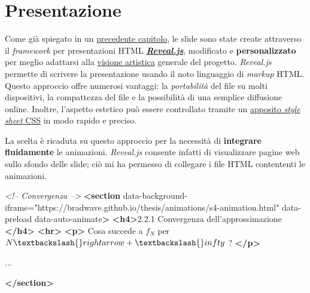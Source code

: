 \documentclass[
]{book}
\newenvironment{Shaded}{\begin{snugshade}}{\end{snugshade}}
\newcommand{\CommentTok}[1]{\textcolor[rgb]{0.56,0.35,0.01}{\textit{#1}}}
\newcommand{\KeywordTok}[1]{\textcolor[rgb]{0.13,0.29,0.53}{\textbf{#1}}}
\newcommand{\NormalTok}[1]{#1}
\newcommand{\OtherTok}[1]{\textcolor[rgb]{0.56,0.35,0.01}{#1}}
\newcommand{\StringTok}[1]{\textcolor[rgb]{0.31,0.60,0.02}{#1}}
\begin{document}
\begin{Shaded}
\begin{Highlighting}[]
    
\end{Highlighting}
\end{Shaded}

\hypertarget{pressoft}{%
\section{Presentazione}\label{pressoft}}

Come già spiegato in un \protect\hyperlink{presentazione}{precedente capitolo}, le slide sono state create attraverso il \emph{framework} per presentazioni HTML \href{https://revealjs.com/}{\emph{\textbf{Reveal.js}}}, modificato e \textbf{personalizzato} per meglio adattarsi alla \protect\hyperlink{filosofia}{visione artistica} generale del progetto. \emph{Reveal.js} permette di scrivere la presentazione usando il noto linguaggio di \emph{markup} HTML. Questo approccio offre numerosi vantaggi: la \emph{portabilità} del file su molti dispositivi, la compattezza del file e la possibilità di una semplice diffusione online.
Inoltre, l'aspetto estetico può essere controllato tramite un \href{https://github.com/Bradwave/thesis/blob/master/dist/theme/math.css}{apposito \emph{style sheet} CSS} in modo rapido e preciso.

La scelta è ricaduta su questo approccio per la necessità di \textbf{integrare fluidamente} le animazioni. \emph{Reveal.js} consente infatti di visualizzare pagine web sullo sfondo delle slide; ciò mi ha permesso di collegare i file HTML contententi le animazioni.

\begin{Shaded}
\begin{Highlighting}[]
\CommentTok{<!-- Convergenza -->}
\KeywordTok{<section}
\OtherTok{  data-background-iframe=}\StringTok{"https://bradwave.github.io/thesis/animations/s4-animation.html"}
\OtherTok{	data-preload data-auto-animate}\KeywordTok{>}
	\KeywordTok{<h4>}\NormalTok{2.2.1 Convergenza dell'approssimazione $ $}\KeywordTok{</h4>}
	\KeywordTok{<hr>}
	\KeywordTok{<p>}
\NormalTok{		Cosa succede a $f_N$ per $N \textbackslash{}rightarrow + \textbackslash{}infty$ ?}
	\KeywordTok{</p>}
	
\NormalTok{	...}
	
\KeywordTok{</section>}
\end{Highlighting}
\end{Shaded}
\end{document}
